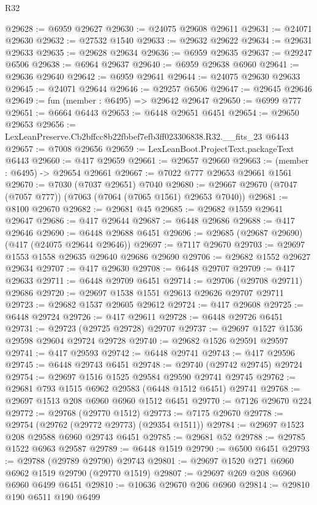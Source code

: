 \begin{lexlean}{R32}
\begin{coremodule}
@29628 := @6959 @29627
@29630 := @24075 @29608 @29611
@29631 := @24071 @29630
@29632 := @27532 @1540
@29633 := @29632 @29622
@29634 := @29631 @29633
@29635 := @29628 @29634
@29636 := @6959 @29635
@29637 := @29247 @6506
@29638 := @6964 @29637
@29640 := @6959 @29638 @6960
@29641 := @29636 @29640
@29642 := @6959 @29641
@29644 := @24075 @29630 @29633
@29645 := @24071 @29644
@29646 := @29257 @6506
@29647 := @29645 @29646
@29649 := fun (member : @6495) => @29642 @29647
@29650 := @6999 @777
@29651 := @6664 @6443
@29653 := @6448 @29651 @6451
@29654 := @29650 @29653
@29656 := LexLeanPreserve.Cb2bffcc8b22fbbef7efb3ff023306838.R32.__fits_23 @6443
@29657 := @7008 @29656
@29659 := LexLeanBoot.ProjectText.packageText @6443
@29660 := @417 @29659
@29661 := @29657 @29660
@29663 := (member : @6495) -> @29654 @29661
@29667 := @7022 @777 @29653 @29661 @1561
@29670 := @7030 (@7037 @29651) @7040
@29680 := @29667 @29670 (@7047 (@7057 @777)) (@7063 (@7064 (@7065 @1561) @29653 @7040))
@29681 := @8100 @29670
@29682 := @29681 @45
@29685 := @29682 @1559 @29641 @29647
@29686 := @417 @29644
@29687 := @6448 @29686
@29688 := @417 @29646
@29690 := @6448 @29688 @6451
@29696 := @29685 (@29687 @29690) (@417 (@24075 @29644 @29646))
@29697 := @7117 @29670
@29703 := @29697 @1553 @1558 @29635 @29640 @29686 @29690
@29706 := @29682 @1552 @29627 @29634
@29707 := @417 @29630
@29708 := @6448 @29707
@29709 := @417 @29633
@29711 := @6448 @29709 @6451
@29714 := @29706 (@29708 @29711) @29686
@29720 := @29697 @1538 @1551 @29613 @29626 @29707 @29711
@29723 := @29682 @1537 @29605 @29612
@29724 := @417 @29608
@29725 := @6448 @29724
@29726 := @417 @29611
@29728 := @6448 @29726 @6451
@29731 := @29723 (@29725 @29728) @29707
@29737 := @29697 @1527 @1536 @29598 @29604 @29724 @29728
@29740 := @29682 @1526 @29591 @29597
@29741 := @417 @29593
@29742 := @6448 @29741
@29743 := @417 @29596
@29745 := @6448 @29743 @6451
@29748 := @29740 (@29742 @29745) @29724
@29754 := @29697 @1516 @1525 @29584 @29590 @29741 @29745
@29762 := @29681 @793 @1515 @6962 @29583 (@6448 @1512 @6451) @29741
@29768 := @29697 @1513 @208 @6960 @6960 @1512 @6451
@29770 := @7126 @29670 @224
@29772 := @29768 (@29770 @1512)
@29773 := @7175 @29670
@29778 := @29754 (@29762 (@29772 @29773) (@29354 @1511))
@29784 := @29697 @1523 @208 @29588 @6960 @29743 @6451
@29785 := @29681 @52
@29788 := @29785 @1522 @6963 @29587
@29789 := @6448 @1519
@29790 := @6500 @6451
@29793 := @29788 (@29789 @29790) @29743
@29801 := @29697 @1520 @271 @6960 @6962 @1519 @29790 (@29770 @1519)
@29807 := @29697 @269 @208 @6960 @6960 @6499 @6451
@29810 := @10636 @29670 @206 @6960
@29814 := @29810 @190 @6511 @190 @6499

\end{coremodule}
\end{lexlean}
